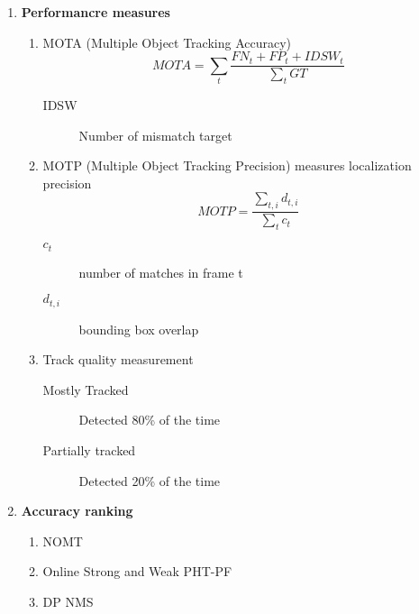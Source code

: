   \begin{enumerate}
    \item
      \textbf{Performancre
      measures}
      \begin{enumerate}
        \item
          MOTA
          (Multiple
          Object
          Tracking
          Accuracy)
          \[MOTA
          =
          \sum_{t}
          \frac{FN_t
          +
          FP_t
          +
          IDSW_t}{\sum_{t}
          GT}\]
          \begin{description}
            \item[IDSW]
              Number
              of
              mismatch
              target
          \end{description}
        \item
          MOTP
          (Multiple
          Object
          Tracking
          Precision)
          measures
          localization
          precision
          \[MOTP
          =
          \frac{\sum_{t,i}
          d_{t,i}}{\sum_t
          c_t}\]
          \begin{description}
            \item[$c_t$]
              number
              of
              matches
              in
              frame
              t
            \item[$d_{t,i}$]
              bounding
              box
              overlap
          \end{description}
        \item
          Track
          quality
          measurement
          \begin{description}
            \item[Mostly
              Tracked]
              Detected
              80\%
              of
              the
              time
            \item[Partially
              tracked]
              Detected
              20\%
              of
              the
              time
          \end{description}
      \end{enumerate}

    \item
      \textbf{Accuracy
      ranking}
      \begin{enumerate}
        \item
          NOMT
          \cite{choi2015near}
        \item
          Online
          Strong
          and
          Weak
          PHT-PF
          \cite{sanchez2016online}
        \item
          DP
          NMS
          \cite{pirsiavash2011globally}
      \end{enumerate}
  \end{enumerate}
